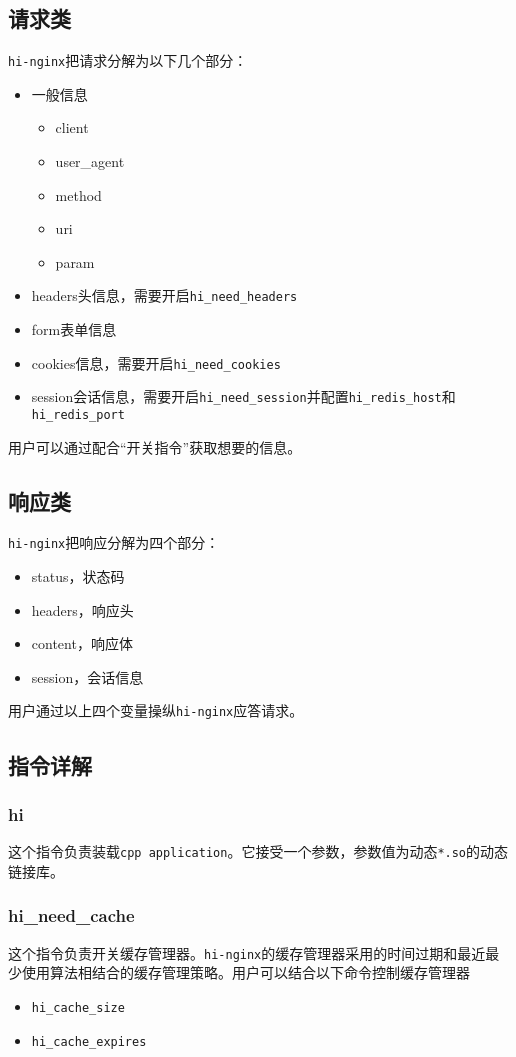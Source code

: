 \subsection{请求类}
\texttt{hi-nginx}把请求分解为以下几个部分：
\begin{itemize}
\item 一般信息
	\begin{itemize}
		\item client
		\item user_agent
		\item method
		\item uri
		\item param
	\end{itemize}
\item headers头信息，需要开启\texttt{hi_need_headers}
\item form表单信息
\item cookies信息，需要开启\texttt{hi_need_cookies}
\item session会话信息，需要开启\texttt{hi_need_session}并配置\texttt{hi_redis_host}和\texttt{hi_redis_port}
\end{itemize}
用户可以通过配合“开关指令”获取想要的信息。
\subsection{响应类}
\texttt{hi-nginx}把响应分解为四个部分：
\begin{itemize}
\item status，状态码
\item headers，响应头
\item content，响应体
\item session，会话信息
\end{itemize}
用户通过以上四个变量操纵\texttt{hi-nginx}应答请求。

\subsection{指令详解}
\subsubsection{hi}
这个指令负责装载\texttt{cpp application}。它接受一个参数，参数值为动态\texttt{*.so}的动态链接库。
\subsubsection{hi_need_cache}
这个指令负责开关缓存管理器。\texttt{hi-nginx}的缓存管理器采用的时间过期和最近最少使用算法相结合的缓存管理策略。用户可以结合以下命令控制缓存管理器
\begin{itemize}
\item \texttt{hi_cache_size}
\item \texttt{hi_cache_expires}
\end{itemize}
